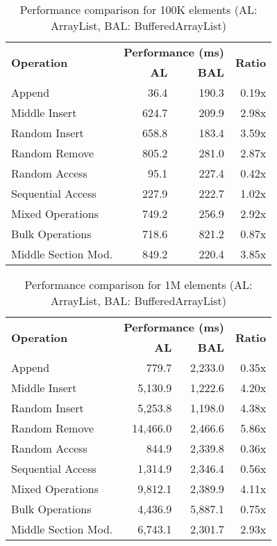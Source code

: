 \begin{table}[t]
\centering
\setlength{\tabcolsep}{3.5pt}
\small
\begin{tabular}{|l|r|r|r|}
\hline
\multirow{2}{*}{\textbf{Operation}} & \multicolumn{2}{c|}{\textbf{Performance (ms)}} & \multirow{2}{*}{\textbf{Ratio}} \\
\cline{2-3}
& \textbf{AL} & \textbf{BAL} & \\
\hline
Append & 36.4 & 190.3 & 0.19x \\
\hline
Middle Insert & 624.7 & 209.9 & 2.98x \\
\hline
Random Insert & 658.8 & 183.4 & 3.59x \\
\hline
Random Remove & 805.2 & 281.0 & 2.87x \\
\hline
Random Access & 95.1 & 227.4 & 0.42x \\
\hline
Sequential Access & 227.9 & 222.7 & 1.02x \\
\hline
Mixed Operations & 749.2 & 256.9 & 2.92x \\
\hline
Bulk Operations & 718.6 & 821.2 & 0.87x \\
\hline
Middle Section Mod. & 849.2 & 220.4 & 3.85x \\
\hline
\end{tabular}
\caption{Performance comparison for 100K elements (AL: ArrayList, BAL: BufferedArrayList)}
\label{tab:performance_100k}
\end{table}

\begin{table}[t]
\centering
\setlength{\tabcolsep}{3.5pt}
\small
\begin{tabular}{|l|r|r|r|}
\hline
\multirow{2}{*}{\textbf{Operation}} & \multicolumn{2}{c|}{\textbf{Performance (ms)}} & \multirow{2}{*}{\textbf{Ratio}} \\
\cline{2-3}
& \textbf{AL} & \textbf{BAL} & \\
\hline
Append & 779.7 & 2,233.0 & 0.35x \\
\hline
Middle Insert & 5,130.9 & 1,222.6 & 4.20x \\
\hline
Random Insert & 5,253.8 & 1,198.0 & 4.38x \\
\hline
Random Remove & 14,466.0 & 2,466.6 & 5.86x \\
\hline
Random Access & 844.9 & 2,339.8 & 0.36x \\
\hline
Sequential Access & 1,314.9 & 2,346.4 & 0.56x \\
\hline
Mixed Operations & 9,812.1 & 2,389.9 & 4.11x \\
\hline
Bulk Operations & 4,436.9 & 5,887.1 & 0.75x \\
\hline
Middle Section Mod. & 6,743.1 & 2,301.7 & 2.93x \\
\hline
\end{tabular}
\caption{Performance comparison for 1M elements (AL: ArrayList, BAL: BufferedArrayList)}
\label{tab:performance_1m}
\end{table}